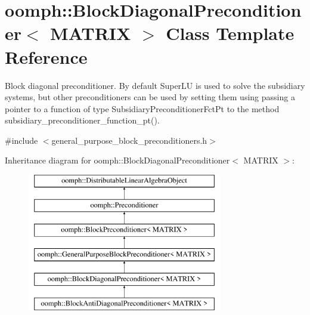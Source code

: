 \hypertarget{classoomph_1_1BlockDiagonalPreconditioner}{}\section{oomph\+:\+:Block\+Diagonal\+Preconditioner$<$ M\+A\+T\+R\+IX $>$ Class Template Reference}
\label{classoomph_1_1BlockDiagonalPreconditioner}


Block diagonal preconditioner. By default Super\+LU is used to solve the subsidiary systems, but other preconditioners can be used by setting them using passing a pointer to a function of type Subsidiary\+Preconditioner\+Fct\+Pt to the method subsidiary\+\_\+preconditioner\+\_\+function\+\_\+pt().  




{\ttfamily \#include $<$general\+\_\+purpose\+\_\+block\+\_\+preconditioners.\+h$>$}

Inheritance diagram for oomph\+:\+:Block\+Diagonal\+Preconditioner$<$ M\+A\+T\+R\+IX $>$\+:\begin{figure}[H]
\begin{center}
\leavevmode
\includegraphics[height=6.000000cm]{classoomph_1_1BlockDiagonalPreconditioner}
\end{center}
\end{figure}
